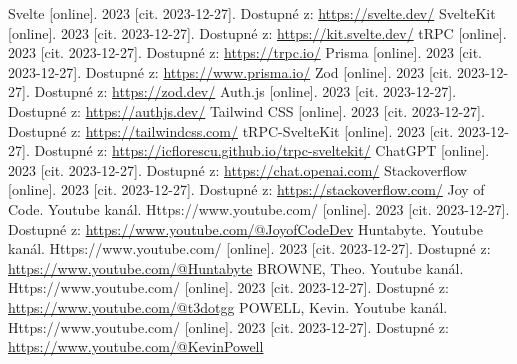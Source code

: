 \documentclass[12pt, a4paper,
openright
]{report}
\let\oldchapter\chapter
\renewcommand{\chapter}{
	\clearpage
	\pagestyle{fancy}
	\oldchapter
}
\begin{document}
	\renewcommand\bibname{Seznam použitých informačních zdrojů}
	\begin{thebibliography}{99}
		
		 Svelte [online]. 2023 [cit. 2023-12-27]. Dostupné z: \url{https://svelte.dev/}
		 SvelteKit [online]. 2023 [cit. 2023-12-27]. Dostupné z:  \url{https://kit.svelte.dev/}
		 tRPC [online]. 2023 [cit. 2023-12-27]. Dostupné z: \url{https://trpc.io/}
		 Prisma [online]. 2023 [cit. 2023-12-27]. Dostupné z: \url{https://www.prisma.io/}
		 Zod [online]. 2023 [cit. 2023-12-27]. Dostupné z: \url{https://zod.dev/}
		 Auth.js [online]. 2023 [cit. 2023-12-27]. Dostupné z: \url{https://authjs.dev/}
		 Tailwind CSS [online]. 2023 [cit. 2023-12-27]. Dostupné z: \url{https://tailwindcss.com/}
		 tRPC-SvelteKit [online]. 2023 [cit. 2023-12-27]. Dostupné z: \url{https://icflorescu.github.io/trpc-sveltekit/}
		 ChatGPT [online]. 2023 [cit. 2023-12-27]. Dostupné z: \url{https://chat.openai.com/}
		 Stackoverflow [online]. 2023 [cit. 2023-12-27]. Dostupné z: \url{https://stackoverflow.com/}
		Joy of Code. Youtube kanál. Https://www.youtube.com/ [online]. 2023 [cit. 2023-12-27]. Dostupné z: \url{https://www.youtube.com/@JoyofCodeDev}
		Huntabyte. Youtube kanál. Https://www.youtube.com/ [online]. 2023 [cit. 2023-12-27]. Dostupné z: \url{https://www.youtube.com/@Huntabyte}
		BROWNE, Theo. Youtube kanál. Https://www.youtube.com/ [online]. 2023 [cit. 2023-12-27]. Dostupné z: \url{https://www.youtube.com/@t3dotgg}
		POWELL, Kevin. Youtube kanál. Https://www.youtube.com/ [online]. 2023 [cit. 2023-12-27]. Dostupné z: \url{https://www.youtube.com/@KevinPowell}
		\
		
	\end{thebibliography}
	
	\listoffigures
	

	\appendix %
	
	\titleformat{\chapter}[block]{\scshape\bfseries\LARGE}{Příloha \thechapter}{10pt}{\vspace{0pt}}[\vspace{-22pt}] %
\end{document}
